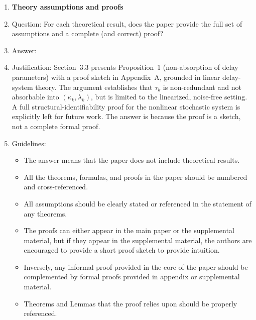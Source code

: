 \begin{enumerate}
\begin{itemize}
        \item The authors should discuss the computational efficiency of the proposed algorithms and how they scale with dataset size.
        \item If applicable, the authors should discuss possible limitations of their approach to address problems of privacy and fairness.
        \item While the authors might fear that complete honesty about limitations might be used by reviewers as grounds for rejection, a worse outcome might be that reviewers discover limitations that aren't acknowledged in the paper. The authors should use their best judgment and recognize that individual actions in favor of transparency play an important role in developing norms that preserve the integrity of the community. Reviewers will be specifically instructed to not penalize honesty concerning limitations.
    \end{itemize}

\item {\bf Theory assumptions and proofs}
    \item[] Question: For each theoretical result, does the paper provide the full set of assumptions and a complete (and correct) proof?
    \item[] Answer: \answerNo{}
    \item[] Justification: Section~3.3 presents Proposition~1 (non-absorption of delay parameters) with a proof sketch in Appendix~A, grounded in linear delay-system theory. The argument establishes that $\tau_k$ is non-redundant and not absorbable into $(\kappa_k,\lambda_k)$, but is limited to the linearized, noise-free setting. A full structural-identifiability proof for the nonlinear stochastic system is explicitly left for future work. The answer is \answerNo{} because the proof is a sketch, not a complete formal proof.
    \item[] Guidelines:
    \begin{itemize}
        \item The answer \answerNA{} means that the paper does not include theoretical results. 
        \item All the theorems, formulas, and proofs in the paper should be numbered and cross-referenced.
        \item All assumptions should be clearly stated or referenced in the statement of any theorems.
        \item The proofs can either appear in the main paper or the supplemental material, but if they appear in the supplemental material, the authors are encouraged to provide a short proof sketch to provide intuition. 
        \item Inversely, any informal proof provided in the core of the paper should be complemented by formal proofs provided in appendix or supplemental material.
        \item Theorems and Lemmas that the proof relies upon should be properly referenced. 
    \end{itemize}


\end{enumerate}
